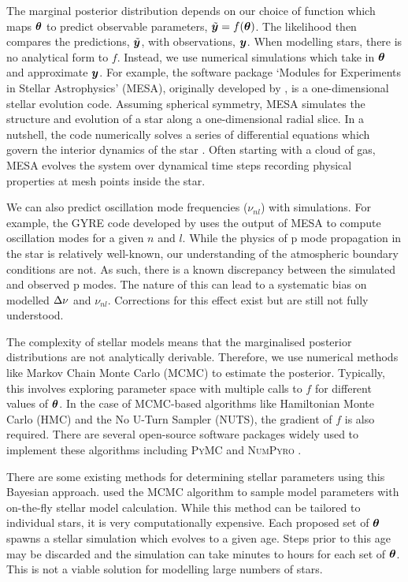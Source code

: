 The marginal posterior distribution depends on our choice of function which maps \(\bm{\theta}\) to predict observable parameters, \(\tilde{\bm{y}} = f(\bm{\theta})\). The likelihood then compares the predictions, \(\tilde{\bm{y}}\), with observations, \(\bm{y}\). When modelling stars, there is no analytical form to \(f\). Instead, we use numerical simulations which take in \(\bm{\theta}\) and approximate \(\bm{y}\). For example, the software package `Modules for Experiments in Stellar Astrophysics' (MESA), originally developed by \citet{Paxton.Bildsten.ea2011}, is a one-dimensional stellar evolution code. Assuming spherical symmetry, MESA simulates the structure and evolution of a star along a one-dimensional radial slice. In a nutshell, the code numerically solves a series of differential equations which govern the interior dynamics of the star \citep[see e.g.][]{Kippenhahn.Weigert.ea2013}. Often starting with a cloud of gas, MESA evolves the system over dynamical time steps recording physical properties at mesh points inside the star.

We can also predict oscillation mode frequencies (\(\nu_{nl}\)) with simulations. For example, the GYRE code developed by \citet{Townsend.Teitler2013} uses the output of MESA to compute oscillation modes for a given \(n\) and \(l\). While the physics of p mode propagation in the star is relatively well-known, our understanding of the atmospheric boundary conditions are not. As such, there is a known discrepancy between the simulated and observed p modes. The nature of this can lead to a systematic bias on modelled \({\Delta\nu}\) and \(\nu_{nl}\). Corrections for this effect exist \citep[e.g.][]{Ball.Gizon2014} but are still not fully understood.

The complexity of stellar models means that the marginalised posterior distributions are not analytically derivable. Therefore, we use numerical methods like Markov Chain Monte Carlo (MCMC) to estimate the posterior. Typically, this involves exploring parameter space with multiple calls to \(f\) for different values of \(\bm{\theta}\). In the case of MCMC-based algorithms like Hamiltonian Monte Carlo (HMC) and the No U-Turn Sampler (NUTS), the gradient of \(f\) is also required. There are several open-source software packages widely used to implement these algorithms including \textsc{PyMC} \citep{Salvatier.Wiecki.ea2016} and \textsc{NumPyro} \citep{Phan.Pradhan.ea2019}.

There are some existing methods for determining stellar parameters using this Bayesian approach. \citet{Bazot.Bourguignon.ea2008} used the MCMC algorithm to sample model parameters with on-the-fly stellar model calculation. While this method can be tailored to individual stars, it is very computationally expensive. Each proposed set of \(\bm{\theta}\) spawns a stellar simulation which evolves to a given age. Steps prior to this age may be discarded and the simulation can take minutes to hours for each set of \(\bm{\theta}\). This is not a viable solution for modelling large numbers of stars.

